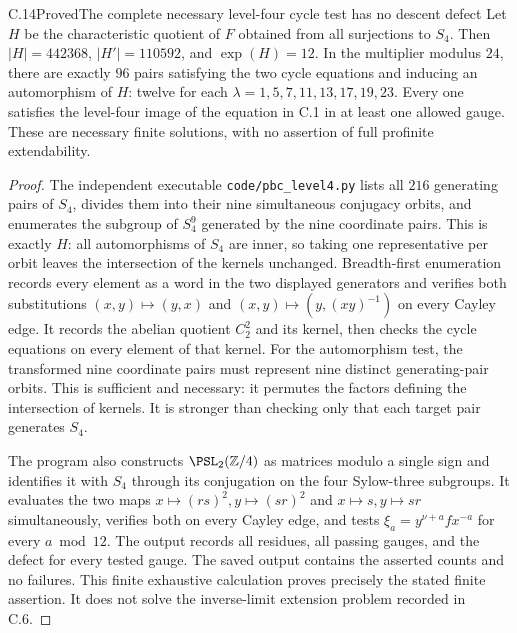 \begin{statement}{C.14}{Proved}{The complete necessary level-four cycle test has no descent defect}
Let $H$ be the characteristic quotient of $F$ obtained from all
surjections to $S_4$. Then $|H|=442368$, $|H'|=110592$, and
$\exp(H)=12$. In the multiplier modulus $24$, there are exactly
$96$ pairs satisfying the two cycle equations and inducing an
automorphism of $H$: twelve for each
$\lambda=1,5,7,11,13,17,19,23$. Every one satisfies the
level-four image of the equation in C.1 in at least one allowed
gauge. These are necessary finite solutions, with no assertion of
full profinite extendability.
\end{statement}
\begin{proof}
The independent executable \texttt{code/pbc\_level4.py} lists all
$216$ generating pairs of $S_4$, divides them into their nine
simultaneous conjugacy orbits, and enumerates the subgroup of
$S_4^9$ generated by the nine coordinate pairs. This is exactly
$H$: all automorphisms of $S_4$ are inner, so taking one representative
per orbit leaves the intersection of the kernels unchanged.
Breadth-first enumeration records every element as a word in the
two displayed generators and verifies both substitutions
$(x,y)\mapsto(y,x)$ and $(x,y)\mapsto(y,(xy)^{-1})$ on every
Cayley edge. It records the abelian quotient $C_2^2$ and its kernel,
then checks the cycle equations on every element of that kernel.
For the automorphism test, the transformed nine coordinate pairs
must represent nine distinct generating-pair orbits. This is
sufficient and necessary: it permutes the factors defining the
intersection of kernels. It is stronger than checking only that
each target pair generates $S_4$.

The program also constructs $\PSL_2(\mathbb Z/4)$ as matrices modulo
a single sign and identifies it with $S_4$ through its conjugation
on the four Sylow-three subgroups. It evaluates the two maps
$x\mapsto(rs)^2,y\mapsto(sr)^2$ and $x\mapsto s,y\mapsto sr$
simultaneously, verifies both on every Cayley edge, and tests
$\xi_a=y^{\nu+a}fx^{-a}$ for every $a\bmod12$. The output records
all residues, all passing gauges, and the defect for every tested
gauge. The saved output contains the asserted counts and no failures.
This finite exhaustive calculation proves precisely the stated
finite assertion. It does not solve the inverse-limit extension
problem recorded in C.6.
\end{proof}


